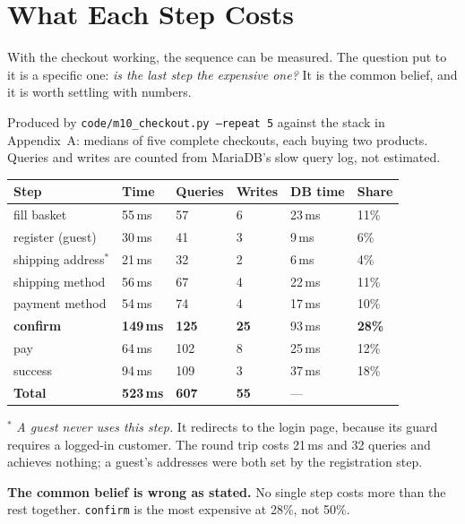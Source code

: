\section{What Each Step Costs}

With the checkout working, the sequence can be measured. The question put to it
is a specific one: \emph{is the last step the expensive one?} It is the common
belief, and it is worth settling with numbers.

\begin{measured}
Produced by \texttt{code/m10\_checkout.py --repeat 5} against the stack in
Appendix~A: medians of five complete checkouts, each buying two products.
Queries and writes are counted from MariaDB's slow query log, not estimated.

\begin{longtable}{@{}L{3.4cm}L{1.7cm}L{1.9cm}L{1.8cm}L{1.7cm}L{1.6cm}@{}}
\toprule
{}
\textbf{Step} & \textbf{Time} & \textbf{Queries} & \textbf{Writes} &
\textbf{DB time} & \textbf{Share} \\
\midrule
\endhead
fill basket & 55\,ms & 57 & 6 & 23\,ms & 11\% \\
register (guest) & 30\,ms & 41 & 3 & 9\,ms & 6\% \\
shipping address$^*$ & 21\,ms & 32 & 2 & 6\,ms & 4\% \\
shipping method & 56\,ms & 67 & 4 & 22\,ms & 11\% \\
payment method & 54\,ms & 74 & 4 & 17\,ms & 10\% \\
\textbf{confirm} & \textbf{149\,ms} & \textbf{125} & \textbf{25} & 93\,ms &
\textbf{28\%} \\
pay & 64\,ms & 102 & 8 & 25\,ms & 12\% \\
success & 94\,ms & 109 & 3 & 37\,ms & 18\% \\
\midrule
\textbf{Total} & \textbf{523\,ms} & \textbf{607} & \textbf{55} & --- & \\
\bottomrule
\end{longtable}

\smallskip
$^*$ \emph{A guest never uses this step.} It redirects to the login page,
because its guard requires a logged-in customer. The round trip costs 21\,ms
and 32 queries and achieves nothing; a guest's addresses were both set by the
registration step.

\smallskip
\textbf{The common belief is wrong as stated.} No single step costs more than
the rest together. \texttt{confirm} is the most expensive at 28\%, not 50\%.


\end{measured}
